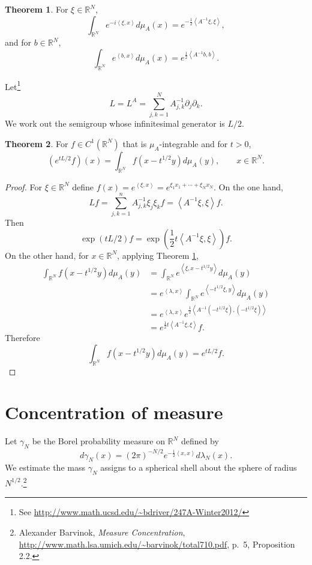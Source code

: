 \documentclass{article}
\newcommand{\inner}[2]{\left\langle #1, #2 \right\rangle}
\theoremstyle{definition}
\newtheorem{theorem}{Theorem}
\theoremstyle{definition}
\begin{document}
\begin{theorem}
For $\xi \in \mathbb{R}^N$,
\[
\int_{\mathbb{R}^N} e^{-i\inner{\xi}{x}} d\mu_A(x) = e^{-\frac{1}{2}\inner{A^{-1}\xi}{\xi}},
\]
and for $b \in \mathbb{R}^N$,
\[
\int_{\mathbb{R}^N} e^{\inner{b}{x}} d\mu_A(x) = e^{\frac{1}{2}\inner{A^{-1}b}{b}}.
\]
\label{gaussianRd}
\end{theorem}


Let\footnote{See \url{http://www.math.ucsd.edu/~bdriver/247A-Winter2012/}}
\[
L=L^A = \sum_{j,k=1}^N A_{j,k}^{-1} \partial_j \partial_k.
\]
We work out the semigroup whose infinitesimal generator is $L/2$.

\begin{theorem}
For $f \in C^1(\mathbb{R}^N)$ that is $\mu_A$-integrable and for $t>0$,
\[
(e^{t L/2} f)(x) = \int_{\mathbb{R}^N} f(x-t^{1/2} y) d\mu_A(y),
\qquad x \in \mathbb{R}^N.
\]
\end{theorem}
\begin{proof}
For $\xi \in \mathbb{R}^N$ define
 $f(x) = e^{\inner{\xi}{x}}=e^{\xi_1 x_1 + \cdots + \xi_N x_N}$. On the one hand,
\[
Lf=\sum_{j,k=1}^n A_{j,k}^{-1} \xi_j \xi_k f
= \inner{A^{-1}\xi}{\xi} f.
\]
Then
\[
\exp(tL/2) f = \exp\left( \frac{1}{2}t \inner{A^{-1}\xi}{\xi} \right) f.
\]
On the other hand, for $x \in \mathbb{R}^N$, applying Theorem \ref{gaussianRd},
\begin{align*}
\int_{\mathbb{R}^N} f(x-t^{1/2}y) d\mu_A(y)&=\int_{\mathbb{R}^N}
e^{\inner{\xi}{x-t^{1/2}y}} d\mu_A(y)\\
&=e^{\inner{\lambda}{x}} \int_{\mathbb{R}^N} e^{\inner{-t^{1/2}\xi}{y}} d\mu_A(y)\\
&=e^{\inner{\lambda}{x}} e^{\frac{1}{2}\inner{A^{-1} (-t^{1/2} \xi)}{(-t^{1/2}\xi)}}\\
&= e^{\frac{1}{2}t\inner{A^{-1}\xi}{\xi}} f.
\end{align*}
Therefore
\[
\int_{\mathbb{R}^N} f(x-t^{1/2}y) d\mu_A(y) = e^{tL/2} f.
\]
\end{proof}



\section{Concentration of measure}
Let $\gamma_N$ be the Borel probability measure on $\mathbb{R}^N$ defined by
\[
d\gamma_N(x) = (2\pi)^{-N/2} e^{-\frac{1}{2} \inner{x}{x}} d\lambda_N(x).
\]
We estimate the mass $\gamma_N$ assigns to a spherical shell about the sphere of radius $N^{1/2}$.\footnote{Alexander
Barvinok, {\em Measure Concentration}, \url{http://www.math.lsa.umich.edu/~barvinok/total710.pdf},
p.~5, Proposition 2.2.}
\end{document}
